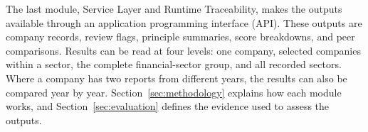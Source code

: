 The last module, Service Layer and Runtime Traceability, makes the outputs available through an application programming interface (API). These outputs are company records, review flags, principle summaries, score breakdowns, and peer comparisons. Results can be read at four levels: one company, selected companies within a sector, the complete financial-sector group, and all recorded sectors. Where a company has two reports from different years, the results can also be compared year by year. Section~\ref{sec:methodology} explains how each module works, and Section~\ref{sec:evaluation} defines the evidence used to assess the outputs.
